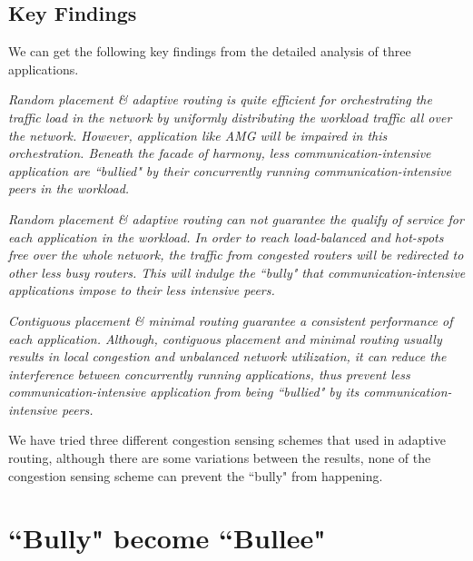 \documentclass[conference,compsoc]{IEEEtran}
\makeatletter
\newcommand{\Rmnum}[1]{\expandafter\@slowromancap\romannumeral #1@}
\makeatother
\begin{document}
\subsection{Key Findings}
We can get the following key findings from the detailed analysis of three applications. 

\emph{Random placement \& adaptive routing is quite efficient for orchestrating the traffic load in the network by uniformly distributing the workload traffic all over the network. However, application like AMG will be impaired in this orchestration. Beneath the facade of harmony, less communication-intensive application are ``bullied" by their concurrently running communication-intensive peers in the workload. }


\emph{Random placement \& adaptive routing can not guarantee the qualify of service for each application in the workload. In order to reach load-balanced and hot-spots free over the whole network, the traffic from congested routers will be redirected to other less busy routers. This will indulge the ``bully" that communication-intensive applications impose to their less intensive peers.}

\emph{Contiguous placement \& minimal routing guarantee a consistent performance of each application. Although, contiguous placement and minimal routing usually results in local congestion and unbalanced network utilization, it can reduce the interference between concurrently running applications, thus prevent less communication-intensive application from being ``bullied" by its communication-intensive peers.}

We have tried three different congestion sensing schemes that used in adaptive routing\cite{won-prog-adaptive}, although there are some variations between the results, none of the congestion sensing scheme can prevent the ``bully" from happening.

\section{``Bully" become ``Bullee"}
\label{sec:workload-2}
\end{document}
